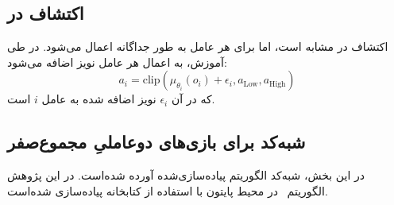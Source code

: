 \subsection{اکتشاف در }

اکتشاف در  مشابه  است، اما برای هر عامل به طور جداگانه اعمال می‌شود. در طی آموزش، به اعمال هر عامل نویز اضافه می‌شود:
\begin{equation}
    a_i = \text{clip}(\mu_{\theta_i}(o_i) + \epsilon_i, a_{\text{Low}}, a_{\text{High}})
\end{equation}
که در آن $\epsilon_i$ نویز اضافه شده به عامل $i$ است.
\subsection{شبه‌کد  برای بازی‌های دو­عاملیِ مجموع­‌صفر}
       در این بخش، شبه‌کد الگوریتم
پیاده‌سازی‌شده آورده شده‌است. در این پژوهش الگوریتم~ در محیط پایتون با استفاده از کتابخانه
 \cite{paszke2017automatic}
پیاده‌سازی شده‌است.
